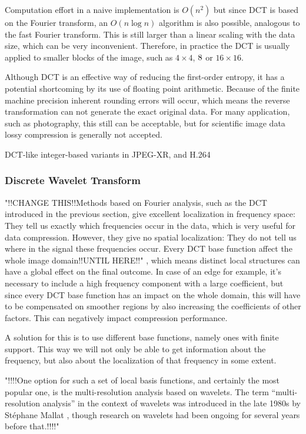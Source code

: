       Computation effort in a naive implementation is $O(n^2)$ but since DCT is based on the Fourier transform, an $O(n \log n)$ algorithm is also possible, analogous to the fast Fourier transform. This is still larger than a linear scaling with the data size, which can be very inconvenient. Therefore, in practice the DCT is usually applied to smaller blocks of the image, such as $4\times4$, $8\time8$ or $16\times16$. 

      Although DCT is an effective way of reducing the first-order entropy, it has a potential shortcoming by its use of floating point arithmetic. Because of the finite machine precision inherent rounding errors will occur, which means the reverse transformation can not generate the exact original data. For many application, such as photography, this still can be acceptable, but for scientific image data lossy compression is generally not accepted.

      DCT-like integer-based variants in JPEG-XR, and H.264


    \subsubsection{Discrete Wavelet Transform}
      "!!CHANGE THIS!!Methods based on Fourier analysis, such as the DCT introduced in the previous section, give excellent localization in frequency space: They tell us exactly which frequencies occur in the data, which is very useful for data compression. However, they give no spatial localization: They do not tell us where in the signal these frequencies occur. Every DCT base function affect the whole image domain!!UNTIL HERE!!"
      , which means distinct local structures can have a global effect on the final outcome. In case of an edge for example, it's necessary to include a high frequency component with a large coefficient, but since every DCT base function has an impact on the whole domain, this will have to be compensated on smoother regions by also increasing the coefficients of other factors. This can negatively impact compression performance.

      A solution for this is to use different base functions, namely ones with finite support. This way we will not only be able to get information about the frequency, but also about the localization of that frequency in some extent.

      "!!!!One option for such a set of local basis functions, and certainly the most popular one, is the multi-resolution analysis based on wavelets. The term “multi-resolution analysis” in the context of wavelets was introduced in the late 1980s by Stéphane Mallat \cite{mallat_theory_1989}, though research on wavelets had been ongoing for several years before that.!!!!"

